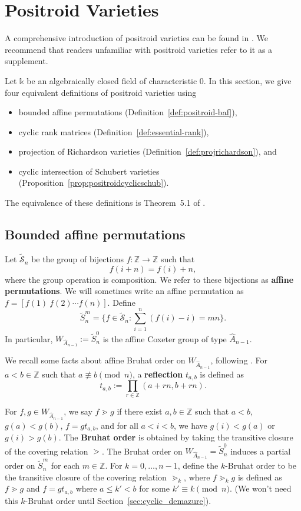 \documentclass[12pt,reqno]{amsart}
\theoremstyle{definition}
\renewcommand{\k}{\mathbb{k}}
\newcommand{\ZZ}{\mathbb{Z}}
\def\ZZ{{\mathbb Z}}
\begin{document}
{\section{Positroid Varieties}
\label{section: positroid-background}
A comprehensive introduction of positroid varieties can be found in \cite{speyer2023richardson}. We recommend that readers unfamiliar with positroid varieties refer to it as a supplement.

Let $\k$ be an algebraically closed field of characteristic 0. 
In this section, we give four equivalent definitions of  positroid varieties using
\begin{itemize}
    \item bounded affine permutations (Definition~\ref{def:positroid-baf}), 
    \item cyclic rank matrices (Definition~\ref{def:essential-rank}), 
    \item projection of Richardson varieties (Definition~\ref{def:projrichardson}), and 
    \item cyclic intersection of Schubert varieties (Proposition~\ref{prop:positroidcyclicschub}).
\end{itemize}
The equivalence of these definitions is Theorem~5.1 of \cite{KLS13juggling}.

\subsection{Bounded affine permutations} Let $\widetilde{\mathcal{S}}_n$ be the group of bijections $f:\ZZ \rightarrow \ZZ$ such that 
\[f(i+n) = f(i)+n,\]
where the group operation is composition. We refer to these bijections as \textbf{affine permutations}.
We will sometimes write an affine permutation as $f = [ f(1)\ f(2) \cdots f(n) ]$. Define
\[\widetilde{S}_n^m = \{f\in \widetilde{\mathcal{S}}_n: \sum_{i = 1}^n (f(i)-i) = mn\}.\]
In particular, $W_{\widehat{A}_{n-1}}:=\widetilde{S}_n^0$ is the affine Coxeter group of type $\widehat{A}_{n-1}$. 


We  recall some facts about affine Bruhat order on $W_{\widehat{A}_{n-1}}$, following \cite{BB2005}. For $a<b\in\ZZ$ such that $a \not\equiv b \pmod n$, a \textbf{reflection}
$t_{a,b}$ is defined as 
\[t_{a,b}:=\prod_{r\in \ZZ}(a+rn, b+rn). \]

For $f,g\in W_{\widehat{A}_{n-1}}$, we say $f\gtrdot g$ if there exist $a,b\in \ZZ$ such that $a<b$,  $g(a)<g(b)$, $f=gt_{a,b}$, and for all $a<i<b$, we have $g(i)<g(a)$ or $g(i)>g(b)$. The \textbf{Bruhat order} is obtained by taking the transitive closure of the covering relation $\gtrdot$. The Bruhat order on $W_{\widehat{A}_{n-1}}=\widetilde{S}_n^0$ induces a partial order on $\widetilde{S}_n^m$ for each $m\in \ZZ$. For $k=0,\dots,n-1$, define the $k$-Bruhat order to be the transitive closure of the covering relation $\gtrdot_k $, where $f\gtrdot_k g$ is defined as $f\gtrdot g$ and $f=gt_{a,b}$ where $a\le k' < b$ for some $k'\equiv k \pmod n$. (We won't need this $k$-Bruhat order until Section~\ref{sec:cyclic_demazure}).


}
\end{document}
